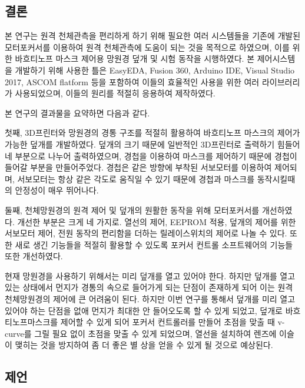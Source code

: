 \documentclass[twoside,11pt]{gshs_thesis}
\begin{document}
\subsection{결론}
  본 연구는 원격 천체관측을 편리하게 하기 위해 필요한 여러 시스템들을 기존에 개발된 모터포커서를 이용하여 원격 천체관측에 도움이 되는 것을 목적으로 하였으며, 이를 위한 바흐티노프 마스크 제어용 망원경 덮개 및 시험 동작을 시행하였다. 본 제어시스템을 개발하기 위해 사용한 틀은 EasyEDA, Fusion 360, Arduino IDE, Visual Studio 2017, ASCOM flatform 등을 포함하여 이들의 효율적인 사용을 위한 여러 라이브러리가 사용되었으며, 이들의 원리를 적절히 응용하여 제작하였다. 

본 연구의 결과물을 요약하면 다음과 같다.

 첫째, 3D프린터와 망원경의 경통 구조를 적절히 활용하여 바흐티노프 마스크의 제어가 가능한 덮개를 개발하였다. 덮개의 크기 때문에 일반적인 3D프린터로 출력하기 힘들어 네 부분으로 나누어 출력하였으며, 경첩을 이용하여 마스크를 제어하기 때문에 경첩이 들어갈 부분을 만들어주었다. 경첩은 같은 방향에 부착된 서보모터를 이용하여 제어되며, 서보모터는 항상 같은 각도로 움직일 수 있기 때문에 경첩과 마스크를 동작시킬때의 안정성이 매우 뛰어나다.
 
 둘째, 천체망원경의 원격 제어 및 덮개의 원활한 동작을 위해 모터포커서를 개선하였다. 개선한 부분은 크게 네 가지로. 열선의 제어, EEPROM 적용, 덮개의 제어를 위한 서보모터 제어, 전원 동작의 편리함을 더하는 릴레이스위치의 제어로 나놀 수 있다. 또한 새로 생긴 기능들을 적절히 활용할 수 있도록 포커서 컨트롤 소프트웨어의 기능들 또한 개선하였다.

 현재 망원경을 사용하기 위해서는 미리 덮개를 열고 있어야 한다. 하지만 덮개를 열고 있는 상태에서 먼지가 경통의 속으로 들어가게 되는 단점이 존재하게 되어 이는 원격 천체망원경의 제어에 큰 어려움이 된다. 하지만 이번 연구를 통해서 덮개를 미리 열고 있어야 하는 단점을 없애 먼지가 최대한 안 들어오도록 할 수 있게 되었고, 덮개로 바흐티노프마스크를 제어할 수 있게 되어 포커서 컨트롤러를 만들어 초점을 맞출 때 v-curve를 그릴 필요 없이 초점을 맞출 수 있게 되었으며, 열선을 설치하여 렌즈에 이슬이 맺히는 것을 방지하여 좀 더 좋은 별 상을 얻을 수 있게 될 것으로 예상된다.

\subsection{제언}

 \newpage
\end{document}
